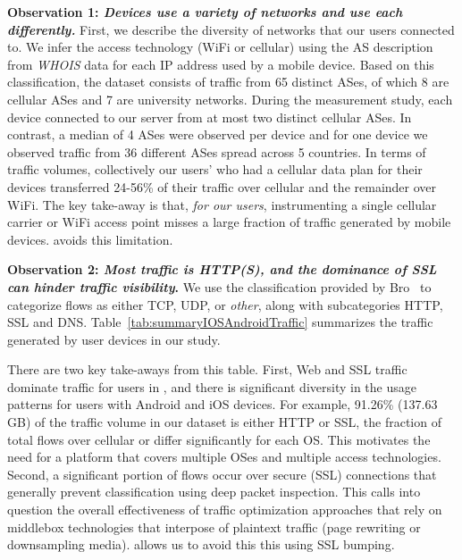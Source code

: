 \noindent\textbf{Observation 1: \emph{Devices use a variety of networks and use each differently.}} First, we describe the diversity 
of networks that our users connected to. 
We infer the access technology (WiFi or cellular) using the AS description from \emph{WHOIS} data for each IP address used by a mobile device.
Based on this classification, the \mobWild dataset consists of traffic from 65 distinct ASes, of which 8 are cellular ASes and 7 are university networks.
During the measurement study, each device connected to our \platname server from at most two distinct cellular ASes. 
In contrast, a median of 4 \wifi ASes were observed per device and for one device we observed traffic from 36 different \wifi ASes spread across 5 countries.
In terms of traffic volumes, collectively our users' who had a cellular data plan for their devices transferred 24-56\% of their traffic over cellular and the remainder over WiFi. 
The key take-away is that, \emph{for our users}, instrumenting a single cellular carrier or WiFi access point misses a 
large fraction of traffic generated by mobile devices. \meddle avoids this limitation.

\noindent\textbf{Observation 2: \emph{Most traffic is HTTP(S), and the dominance of SSL can hinder traffic visibility}.} We use the classification 
provided by Bro~\cite{bro} to categorize flows as either TCP, UDP, or \emph{other}, along with subcategories HTTP, SSL and DNS.
Table~\ref{tab:summaryIOSAndroidTraffic} summarizes the traffic generated by user devices in our study. 

There are two key  
take-aways from this table. First, Web and SSL traffic dominate traffic for users in \mobWild, 
and there is significant diversity in the usage patterns for 
users with Android and iOS devices. For example, 91.26\% (137.63 GB) of the traffic volume in our \mobWild dataset is either HTTP or SSL, 
the fraction of total flows over cellular or \wifi differ significantly for each OS. This motivates the need for a platform that covers 
multiple OSes and multiple access technologies. Second, a significant portion of flows occur over secure (SSL) connections 
that generally prevent classification using deep packet inspection. This calls into question 
the overall effectiveness of traffic optimization approaches that rely 
on middlebox technologies that interpose of plaintext traffic (\eg page rewriting or 
downsampling media). \meddle allows us to avoid this this using SSL bumping.


